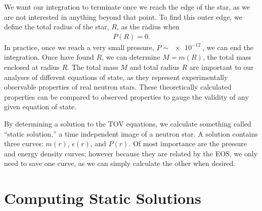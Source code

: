 We want our integration to terminate once we reach the edge of the star, as we are not interested in anything beyond that point. To find this outer edge, we define the total radius of the star, $R$, as the radius when 
\begin{align}
    P(R) = 0.
\end{align}
In practice, once we reach a very small pressure, $P \sim \SI{e-12}{}$, we can end the integration. Once  have found $R$, we can determine $M = m(R)$, the total mass enclosed at radius $R$. The total mass $M$ and total radius $R$ are important to our analyses of different equations of state, as they represent experimentally observable properties of real neutron stars. These theoretically calculated properties can be compared to observed properties to gauge the validity of any given equation of state.

By determining a solution to the TOV equations, we calculate something called ``static solution,'' a time independent image of a neutron star. A solution contains three curves: $m(r)$, $\epsilon(r)$, and $P(r)$. Of most importance are the pressure and energy density curves; however because they are related by the EOS, we only need to save one curve, as we can simply calculate the other when desired.


\section{Computing Static Solutions}\label{sec: tov, computing static solutions}

